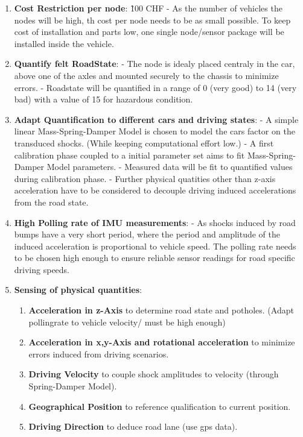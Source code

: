 \documentclass[12pt,a4paper]{article}
\begin{document}
\begin{enumerate}
\item \textbf{Cost Restriction per node}: \~100 CHF
   - As the number of vehicles the nodes will be high, th cost per node needs to be as small possible. To keep cost of installation and parts low, one single node/sensor package will be installed inside the vehicle.

\item \textbf{Quantify felt RoadState}:
   - The node is idealy placed centraly in the car, above one of the axles and mounted securely to the chassis to minimize errors.
   - Roadstate will be quantified in a range of 0 (very good) to 14 (very bad) with a value of 15 for hazardous condition.

\item \textbf{Adapt Quantification to different cars and driving states}:
   - A simple linear Mass-Spring-Damper Model is chosen to model the cars factor on the transduced shocks. (While keeping computational effort low.)
   - A first calibration phase coupled to a initial parameter set aims to fit Mass-Spring-Damper Model parameters.
   - Measured data will be fit to quantified values during calibration phase.
   - Further physical quatities other than z-axis acceleration have to be considered to decouple driving induced accelerations from the road state.

\item \textbf{High Polling rate of IMU measurements}:
   - As shocks induced by road bumps have a very short period, where the period and amplitude of the induced acceleration is proportional to vehicle speed. The polling rate needs to be chosen high enough to ensure reliable sensor readings for road specific driving speeds.

\item \textbf{Sensing of physical quantities}:
   \begin{enumerate}
   \item \textbf{Acceleration in z-Axis} to determine road state and potholes. (Adapt pollingrate to vehicle velocity/ must be high enough)
   \item \textbf{Acceleration in x,y-Axis and rotational acceleration} to minimize errors induced from driving scenarios.
   \item \textbf{Driving Velocity} to couple shock amplitudes to velocity (through Spring-Damper Model).
   \item \textbf{Geographical Position} to reference qualification to current position.
   \item \textbf{Driving Direction} to deduce road lane (use gps data).
   \end{enumerate}


\end{enumerate}
\end{document}
